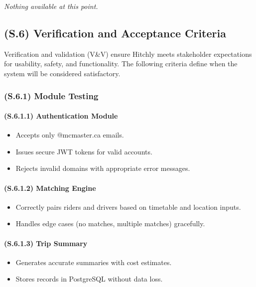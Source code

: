 \documentclass[12pt,letterpaper]{article}
\begin{document}
\textit{Nothing available at this point.}

\subsection{(S.6) Verification and Acceptance Criteria} %

Verification and validation (V\&V) ensure Hitchly meets stakeholder expectations for usability, safety, and functionality. The following criteria define when the system will be considered satisfactory.

\subsubsection{(S.6.1) Module Testing} %

\paragraph{(S.6.1.1) Authentication Module} %
\begin{itemize}
    \item Accepts only @mcmaster.ca emails.
    \item Issues secure JWT tokens for valid accounts.
    \item Rejects invalid domains with appropriate error messages.
\end{itemize}

\paragraph{(S.6.1.2) Matching Engine} %
\begin{itemize}
    \item Correctly pairs riders and drivers based on timetable and location inputs.
    \item Handles edge cases (no matches, multiple matches) gracefully.
\end{itemize}

\paragraph{(S.6.1.3) Trip Summary} %
\begin{itemize}
    \item Generates accurate summaries with cost estimates.
    \item Stores records in PostgreSQL without data loss.
\end{itemize}
\end{document}
